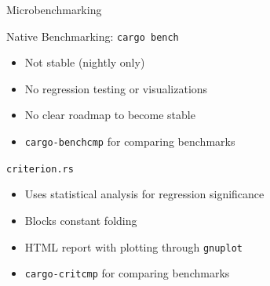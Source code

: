 \documentclass[compress,aspectratio=169]{beamer}
\begin{document}
\begin{frame}{Microbenchmarking}
  \begin{block}{Native Benchmarking: \texttt{cargo bench} \cite{cargobench}}
    \begin{itemize}
      \item Not stable (nightly only)
      \item No regression testing or visualizations
      \item No clear roadmap to become stable \cite{cargounstable}
      \item \texttt{cargo-benchcmp} \cite{benchcmp} for comparing benchmarks
    \end{itemize}
  \end{block}
  \pause
  \begin{block}{\texttt{criterion.rs} \cite{criterion}}
    \begin{itemize}
      \item Uses statistical analysis for regression significance
      \item Blocks constant folding
      \item HTML report with plotting through \texttt{gnuplot} \cite{gnuplot}
      \item \texttt{cargo-critcmp} for comparing benchmarks \cite{critcmp}
    \end{itemize}
  \end{block}
\end{frame}
\end{document}
